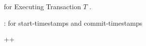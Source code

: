 \setcounter{algorithm}{1}
\begin{algorithm}[H]
  \caption{\rvsimp{} for Executing Transaction $T$ .}
  \begin{algorithmic}[1]
    \Statex \tots{}: for start-timestamps and commit-timestamps

    	\label{line:rvsimp-getts}
      \State \Return ++\tots{}
    \EndProcedure
  \end{algorithmic}
\end{algorithm}
